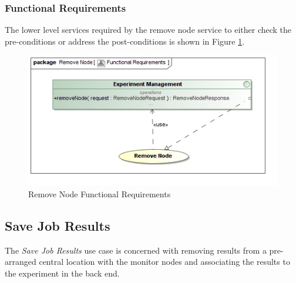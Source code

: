 \subsubsection {Functional Requirements}
The lower level services required by the remove node service to 
either check the pre-conditions or address the post-conditions is shown in
Figure \ref{fig:removeNodeFunctionalRequirements}.
\begin{figure}[H]
  \begin{center}
  \includegraphics[scale=0.38]{../Diagrams and Charts/Experiment/Remove Node Functional Requirements.jpg}
  \caption{Remove Node Functional Requirements}
  \label{fig:removeNodeFunctionalRequirements}
  \end{center}
\end{figure}



\subsection {Save Job Results}
The \textit{Save Job Results} use case is concerned with removing results from a
pre-arranged central location with the monitor nodes and associating the results
to the experiment in the back end.

